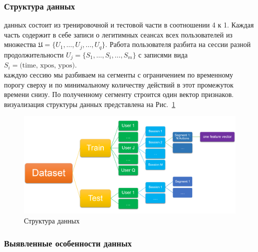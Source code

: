 \documentclass[12pt]{article}
\begin{document}
    \newpage


    \subsubsection{Структура данных}
    
     данных состоит из тренировочной и тестовой части в соотношении 4 к 1. Каждая часть содержит в себе записи о легитимных сеансах всех пользователей из множества $\mathfrak{U}=\{U_1, \ldots, U_j, \ldots, U_q\}$. Работа пользователя разбита на сессии разной продолжительности $U_j = \{S_1, \ldots, S_i, \ldots, S_m\}$ с записями вида $S_i = \text{(time, xpos, ypos)}$. \\
     каждую сессию мы разбиваем на сегменты с ограничением по временному порогу сверху и по минимальному количеству действий в этот промежуток времени снизу. По полученному сегменту строится один вектор признаков. \\
     визуализация структуры данных представлена на Рис.~\ref{sec:Research:Data:Description:fig:DataStructure}

    \label{sec:Research:Data:Struct}
        \begin{figure}[h]
        \centering
        \includegraphics[width=\linewidth]{DataStructure.png}
        \caption{Структура данных}
        \label{sec:Research:Data:Description:fig:DataStructure}
    \end{figure}


    \subsubsection{Выявленные особенности данных}
    \label{sec:Research:Data:Features}
    
\end{document}
